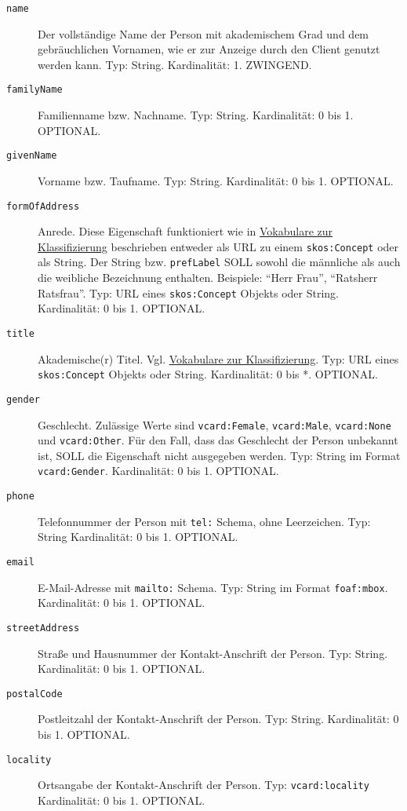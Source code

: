 \documentclass[,a4paper]{article}
\begin{document}
\begin{description}
\item[\texttt{name}]
Der vollständige Name der Person mit akademischem Grad und dem
gebräuchlichen Vornamen, wie er zur Anzeige durch den Client genutzt
werden kann. Typ: String. Kardinalität: 1. ZWINGEND.
\item[\texttt{familyName}]
Familienname bzw. Nachname. Typ: String. Kardinalität: 0 bis 1.
OPTIONAL.
\item[\texttt{givenName}]
Vorname bzw. Taufname. Typ: String. Kardinalität: 0 bis 1. OPTIONAL.
\item[\texttt{formOfAddress}]
Anrede. Diese Eigenschaft funktioniert wie in
\hyperref[vokabulareux5fklassifizierung]{Vokabulare zur Klassifizierung}
beschrieben entweder als URL zu einem \texttt{skos:Concept} oder als
String. Der String bzw. \texttt{prefLabel} SOLL sowohl die männliche als
auch die weibliche Bezeichnung enthalten. Beispiele: ``Herr \textbar{}
Frau'', ``Ratsherr \textbar{} Ratsfrau''. Typ: URL eines
\texttt{skos:Concept} Objekts oder String. Kardinalität: 0 bis 1.
OPTIONAL.
\item[\texttt{title}]
Akademische(r) Titel. Vgl.
\hyperref[vokabulareux5fklassifizierung]{Vokabulare zur
Klassifizierung}. Typ: URL eines \texttt{skos:Concept} Objekts oder
String. Kardinalität: 0 bis *. OPTIONAL.
\item[\texttt{gender}]
Geschlecht. Zulässige Werte sind \texttt{vcard:Female},
\texttt{vcard:Male}, \texttt{vcard:None} und \texttt{vcard:Other}. Für
den Fall, dass das Geschlecht der Person unbekannt ist, SOLL die
Eigenschaft nicht ausgegeben werden. Typ: String im Format
\texttt{vcard:Gender}. Kardinalität: 0 bis 1. OPTIONAL.
\item[\texttt{phone}]
Telefonnummer der Person mit \texttt{tel:} Schema, ohne Leerzeichen.
Typ: String Kardinalität: 0 bis 1. OPTIONAL.
\item[\texttt{email}]
E-Mail-Adresse mit \texttt{mailto:} Schema. Typ: String im Format
\texttt{foaf:mbox}. Kardinalität: 0 bis 1. OPTIONAL.
\item[\texttt{streetAddress}]
Straße und Hausnummer der Kontakt-Anschrift der Person. Typ: String.
Kardinalität: 0 bis 1. OPTIONAL.
\item[\texttt{postalCode}]
Postleitzahl der Kontakt-Anschrift der Person. Typ: String.
Kardinalität: 0 bis 1. OPTIONAL.
\item[\texttt{locality}]
Ortsangabe der Kontakt-Anschrift der Person. Typ:
\texttt{vcard:locality} Kardinalität: 0 bis 1. OPTIONAL.

\end{description}
\end{document}
